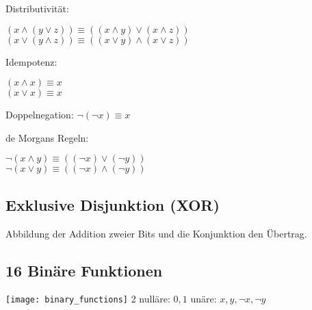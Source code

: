 Distributivität:
\vspace{-0.32cm}
\begin{multicols*}{2}
$(x \wedge (y \vee z)) \equiv ((x \wedge y) \vee (x \wedge z))$\\
$(x \vee (y \wedge z)) \equiv ((x \vee y) \wedge (x \vee z))$\\
\end{multicols*}
\vspace{-0.50cm}

Idempotenz:
\vspace{-0.32cm}
\begin{multicols*}{2}
$(x \wedge x) \equiv x$\\
$(x \vee x) \equiv x$\\
\end{multicols*}
\vspace{-0.50cm}

Doppelnegation:
$\neg (\neg x) \equiv x$

de Morgans Regeln:
\vspace{-0.32cm}
\begin{multicols*}{2}
$\neg (x \wedge y) \equiv ((\neg x) \vee (\neg y))$\\
$\neg (x \vee y) \equiv ((\neg x) \wedge (\neg y))$\\
\end{multicols*}
\vspace{-0.50cm}

\subsection{Exklusive Disjunktion (XOR) }
Abbildung der Addition zweier Bits und die Konjunktion den Übertrag.

\subsection{16 Binäre Funktionen}
\texttt{[image: binary\_functions]}
2 nulläre: $0, 1$  unäre: $x, y, \neg x, \neg y$